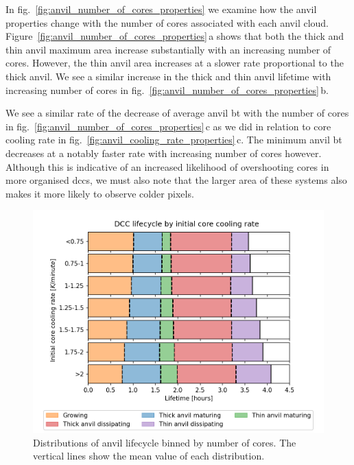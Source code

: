 In fig.~\ref{fig:anvil_number_of_cores_properties} we examine how the anvil properties change with the number of cores associated with each anvil cloud.
Figure~\ref{fig:anvil_number_of_cores_properties}\,a shows that both the thick and thin anvil maximum area increase substantially with an increasing number of cores.
However, the thin anvil area increases at a slower rate proportional to the thick anvil.
We see a similar increase in the thick and thin anvil lifetime with increasing number of cores in fig.~\ref{fig:anvil_number_of_cores_properties}\,b.

We see a similar rate of the decrease of average anvil \acrshort{bt} with the number of cores in fig.~\ref{fig:anvil_number_of_cores_properties}\,c as we did in relation to core cooling rate in fig.~\ref{fig:anvil_cooling_rate_properties}\,c.
The minimum anvil \acrshort{bt} decreases at a notably faster rate with increasing number of cores however.
Although this is indicative of an increased likelihood of overshooting cores in more organised \acrshort{dcc}s, we must also note that the larger area of these systems also makes it more likely to observe colder pixels.

\begin{figure}[tp]
    \centering
    \includegraphics[width=\textwidth]{figures/chapter3_08.png}
    \caption[
    Distributions of anvil lifecycle binned by number of cores
    ]{
    Distributions of anvil lifecycle binned by number of cores. The vertical lines show the mean value of each distribution.
    }
    \label{fig:anvil_number_of_cores_lifecycle}
\end{figure}

